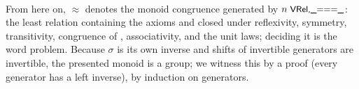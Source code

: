 \begin{code}
\AgdaSpace{}%
\AgdaSpace{}%
\AgdaOperator{\AgdaInductiveConstructor{]ʷ}}\AgdaSpace{}%
\AgdaOperator{\AgdaDatatype{===}}\AgdaSpace{}%
\AgdaOperator{\AgdaInductiveConstructor{[}}\AgdaSpace{}%
\AgdaSpace{}%
\AgdaSpace{}%
\AgdaOperator{\AgdaInductiveConstructor{]ʷ}}\AgdaSpace{}%
\AgdaSpace{}%
\AgdaOperator{\AgdaInductiveConstructor{[}}\AgdaSpace{}%
\AgdaSpace{}%
\AgdaSpace{}%
\AgdaOperator{\AgdaInductiveConstructor{]ʷ}}\<%
\\
%
\>[2]\AgdaSpace{}%
\AgdaSymbol{:}\AgdaSpace{}%
\AgdaSymbol{(}\AgdaSpace{}%
\AgdaSymbol{:}\AgdaSpace{}%
\AgdaSpace{}%
\AgdaSymbol{)}\AgdaSpace{}%
\AgdaSymbol{(}\AgdaSpace{}%
\AgdaSymbol{:}\AgdaSpace{}%
\AgdaSpace{}%
\AgdaSymbol{)}\AgdaSpace{}%
\AgdaSpace{}%
\AgdaSymbol{(}\AgdaSpace{}%
\AgdaSymbol{)}\AgdaSpace{}%
\AgdaSpace{}%
\AgdaOperator{\AgdaInductiveConstructor{[}}\AgdaSpace{}%
\AgdaSpace{}%
\AgdaSpace{}%
\AgdaSpace{}%
\AgdaOperator{\AgdaInductiveConstructor{]ʷ}}\AgdaSpace{}%
\AgdaSpace{}%
\AgdaOperator{\AgdaInductiveConstructor{[}}\AgdaSpace{}%
\AgdaSpace{}%
\AgdaSpace{}%
\AgdaOperator{\AgdaInductiveConstructor{]ʷ}}\AgdaSpace{}%
\AgdaOperator{\AgdaDatatype{===}}\AgdaSpace{}%
\AgdaOperator{\AgdaInductiveConstructor{[}}\AgdaSpace{}%
\AgdaSpace{}%
\AgdaSpace{}%
\AgdaOperator{\AgdaInductiveConstructor{]ʷ}}\AgdaSpace{}%
\AgdaSpace{}%
\AgdaOperator{\AgdaInductiveConstructor{[}}\AgdaSpace{}%
\AgdaSpace{}%
\AgdaSpace{}%
\AgdaSpace{}%
\AgdaOperator{\AgdaInductiveConstructor{]ʷ}}\<%
\end{code}

From here on,
$\approx$ denotes the monoid congruence generated by
$n\;\mbox{\textsf{\small VRel,{\_}==={\_}}}$: the least relation
containing the axioms and closed under reflexivity, symmetry, transitivity,
congruence of , associativity, and the unit laws; deciding it is
the word problem.  Because $\sigma$ is its own inverse and shifts of
invertible generators are invertible, the presented monoid is a group; we
witness this by a  proof (every generator has a left
inverse), by induction on generators.

